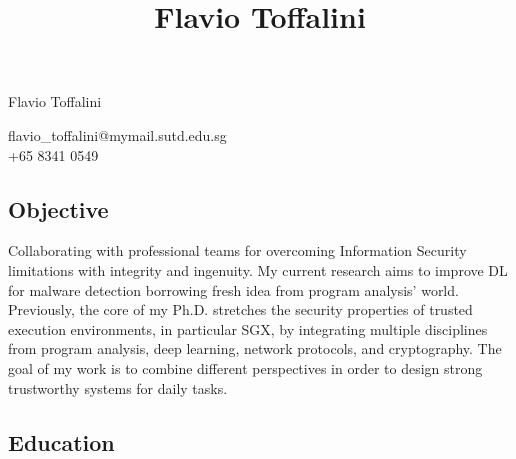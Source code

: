 \documentclass[a4paper, 10pt]{article}
\title{\bfseries\Large Flavio Toffalini}
\author{}
\date{}
\begin{document}
\begin{center}
\Large Flavio Toffalini\\
\end{center}


\begin{center}
flavio\_toffalini@mymail.sutd.edu.sg\\
+65 8341 0549\\
\end{center}


\subsection*{Objective}
Collaborating with professional teams for overcoming Information Security 
limitations with integrity and ingenuity.
My current research aims to improve DL for malware detection borrowing fresh 
idea from program analysis' world.
Previously, the core of my Ph.D. stretches the security properties of trusted 
execution environments, in particular SGX, by integrating multiple disciplines 
from program analysis, deep learning, network protocols, and cryptography.
The goal of my work is to combine different perspectives in order to design 
strong trustworthy systems for daily tasks.



\subsection*{Education}
\end{document}
